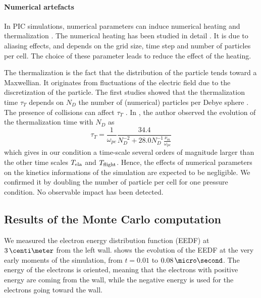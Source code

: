 
    \paragraph{Numerical artefacts \\}
    In PIC simulations, numerical parameters can induce numerical heating and thermalization \citep{lai2014}.
    The numerical heating has been studied in detail \citep{birdsall1991}.
    It is due to aliasing effects, and depends on the grid size, time step and number of particles per cell.
    The choice of these parameter leads to reduce the effect of the heating.

    The thermalization is the fact that the distribution of the particle tends toward a Maxwellian.
    It originates from fluctuations of the electric field due to the discretization of the particle.
    The first studies showed that the thermalization time $\tau_T$ depends on $N_D$ the number of (numerical) particles per Debye sphere \citep{dawson1964,montgomery1970}.
    The presence of collisions can affect $\tau_T$  \citep{turner2006,lai2014}.
    In \citet{turner2006}, the author observed the evolution of the thermalization time with $N_D$ as
    \begin{equation} \label{eq-taut}
      \tau_T = \frac{1}{\omega_{pe}} \frac{34.4}{N_D^{-2} + 28.0 N_D^{-1} \frac{\nu_m}{\omega_{pe}}}
    \end{equation}
    which gives in our condition a time-scale several orders of magnitude larger than the other time scales $T_{\rm ela}$ and $T_{\rm flight}$.
    Hence, the effects of numerical parameters on the kinetics informations of the simulation are expected to be negligible.
    We confirmed it by doubling the number of particle per cell for one pressure condition.
    No observable impact has been detected.

  \subsection{Results of the Monte Carlo computation} \label{subsec-MCMresults}

    We measured the electron energy distribution function (EEDF) at $3\,\centi\meter$ from the left wall.
     shows the evolution of the EEDF at the very early moments of the simulation, from $t=0.01$ to $0.08\,\micro\second$.
    The energy of the electrons is oriented, meaning that the electrons with positive energy are coming from the wall, while the negative energy is used for the electrons going toward the wall.

